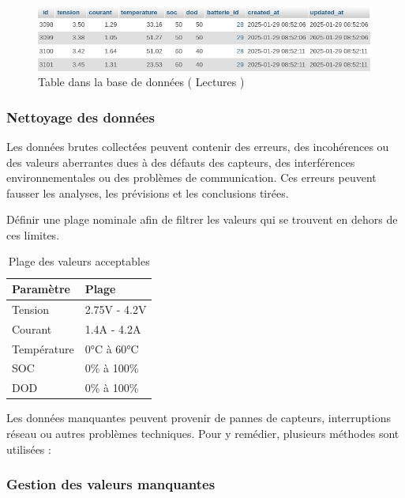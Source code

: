 \begin{figure}[H]
	\centering
	\includegraphics[width=17cm]{./img/tableLecture.png}
	\caption{Table dans la base de données ( Lectures )}
\end{figure}

\subsubsection{Nettoyage des données}
Les données brutes collectées peuvent contenir des erreurs, des incohérences ou des valeurs aberrantes dues à des défauts des capteurs, des interférences environnementales ou des problèmes de communication. Ces erreurs peuvent fausser les analyses, les prévisions et les conclusions tirées.

Définir une plage nominale afin de filtrer les valeurs qui se trouvent en dehors de ces limites.



\begin{table}[H]
	\centering
	\caption{Plage des valeurs acceptables}
	\begin{tabular}{|p{5cm}|p{5cm}|}
		\hline
		\textbf{Paramètre} & \textbf{Plage} \\
		\hline
		Tension & 2.75V - 4.2V \\
		\hline
		Courant & 1.4A - 4.2A \\
		\hline
		Température & 0°C à 60°C \\
		\hline
		SOC & 0\% à 100\% \\
		\hline
		DOD & 0\% à 100\% \\
		\hline
	\end{tabular}
\end{table}

Les données manquantes peuvent provenir de pannes de capteurs, interruptions réseau ou autres problèmes techniques. Pour y remédier, plusieurs méthodes sont utilisées :

\subsubsection{Gestion des valeurs manquantes}

